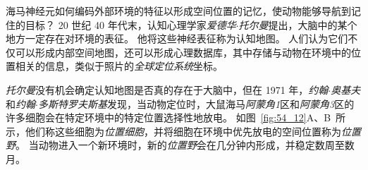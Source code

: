 海马神经元如何编码外部环境的特征以形成空间位置的记忆，使动物能够导航到记住的目标？
20 世纪 40 年代末，认知心理学家\textit{爱德华$\cdot$托尔曼}提出，大脑中的某个地方一定存在对环境的表征。
他将这些神经表征称为认知地图。
人们认为它们不仅可以形成内部空间地图，还可以形成心理数据库，其中存储与动物在环境中的位置相关的信息，类似于照片的\textit{全球定位系统}坐标。


\textit{托尔曼}没有机会确定认知地图是否真的存在于大脑中，但在 1971 年，\textit{约翰$\cdot$奥基夫}和\textit{约翰$\cdot$多斯特罗夫斯基}发现，当动物定位时，大鼠海马\textit{阿蒙角1}区和\textit{阿蒙角3}区的许多细胞会在特定环境中的特定位置选择性地放电。
如图~\ref{fig:54_12}A、B~所示，他们称这些细胞为\textit{位置细胞}，并将细胞在环境中优先放电的空间位置称为\textit{位置野}。
当动物进入一个新环境时，新的\textit{位置野}会在几分钟内形成，并稳定数周至数月。


